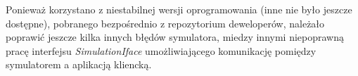 	Ponieważ korzystano z niestabilnej wersji oprogramowania (inne nie było jeszcze dostępne), pobranego bezpośrednio z repozytorium deweloperów, należało poprawić jeszcze kilka innych błędów symulatora,
	miedzy innymi niepoprawną pracę interfejsu \textit{SimulationIface} umożliwiającego komunikację pomiędzy symulatorem a aplikacją kliencką.